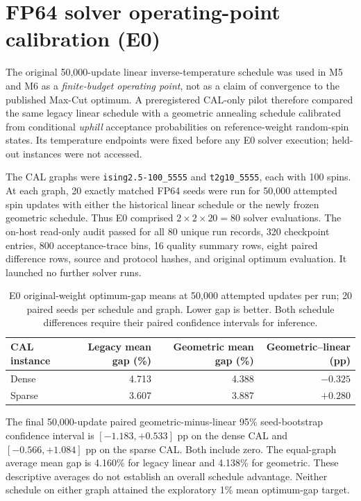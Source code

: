 \section{FP64 solver operating-point calibration (E0)}
\label{sec:e0-calibration}

The original 50,000-update linear inverse-temperature schedule
was used in M5 and M6 as a \emph{finite-budget operating point},
not as a claim of convergence to the published Max-Cut optimum.
A preregistered CAL-only pilot therefore compared the same
legacy linear schedule with a geometric annealing schedule
calibrated from conditional \emph{uphill} acceptance probabilities
on reference-weight random-spin states. Its temperature endpoints
were fixed before any E0 solver execution; held-out instances
were not accessed.

The CAL graphs were \texttt{ising2.5-100\_5555} and
\texttt{t2g10\_5555}, each with 100 spins. At each graph,
20 exactly matched FP64 seeds were run for 50,000 attempted
spin updates with either the historical linear schedule
or the newly frozen geometric schedule. Thus E0 comprised
$2\times2\times20=80$ solver evaluations. The on-host
read-only audit passed for all 80 unique run records,
320 checkpoint entries, 800 acceptance-trace bins,
16 quality summary rows, eight paired difference
rows, source and protocol hashes, and original optimum
evaluation. It launched no further solver runs.

\begin{table}[htbp]\centering\small
\begin{tabular}{@{}l rrr@{}}\toprule
CAL instance & Legacy mean gap (\%) &
Geometric mean gap (\%) & Geometric--linear (pp)\\\midrule
Dense & 4.713 & 4.388 & $-0.325$\\
Sparse & 3.607 & 3.887 & $+0.280$\\\bottomrule
\end{tabular}
\caption{E0 original-weight optimum-gap means at 50,000
attempted updates per run; 20 paired seeds per schedule and
graph. Lower gap is better. Both schedule differences require
their paired confidence intervals for inference.}
\label{tab:e0-means}
\end{table}

The final 50,000-update paired geometric-minus-linear
95\% seed-bootstrap confidence interval is
$[-1.183,+0.533]$ pp on the dense CAL and
$[-0.566,+1.084]$ pp on the sparse CAL. Both
include zero. The equal-graph average mean gap is
4.160\% for legacy linear and 4.138\% for geometric.
These descriptive averages do not establish an
overall schedule advantage. Neither schedule on
either graph attained the exploratory 1\% mean
optimum-gap target.

